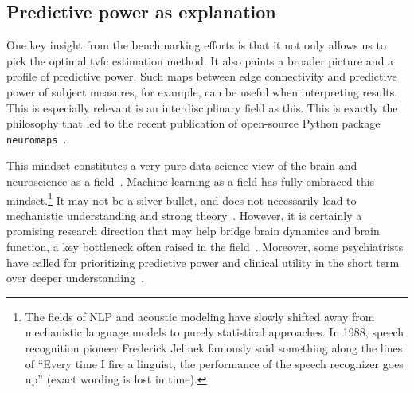 \subsection{Predictive power as explanation}

One key insight from the benchmarking efforts is that it not only allows us to pick the optimal \gls{tvfc} estimation method.
It also paints a broader picture and a profile of predictive power.
Such maps between edge connectivity and predictive power of subject measures, for example, can be useful when interpreting results.
This is especially relevant is an interdisciplinary field as this.
This is exactly the philosophy that led to the recent publication of open-source Python package \texttt{neuromaps}~\parencite{Markello2022}.

This mindset constitutes a very pure data science view of the brain and neuroscience as a field~\parencite[see also][]{Yarkoni2017}.
Machine learning as a field has fully embraced this mindset.\footnote{The fields of NLP and acoustic modeling have slowly shifted away from mechanistic language models to purely statistical approaches. In 1988, speech recognition pioneer Frederick Jelinek famously said something along the lines of ``Every time I fire a linguist, the performance of the speech recognizer goes up'' (exact wording is lost in time).}
It may not be a silver bullet, and does not necessarily lead to mechanistic understanding and strong theory~\parencite[see e.g.][]{Jonas2017}.
However, it is certainly a promising research direction that may help bridge brain dynamics and brain function, a key bottleneck often raised in the field~\parencite{Kopell2014}.
Moreover, some psychiatrists have called for prioritizing predictive power and clinical utility in the short term over deeper understanding~\parencite{Paulus2015, Winter2022}.
